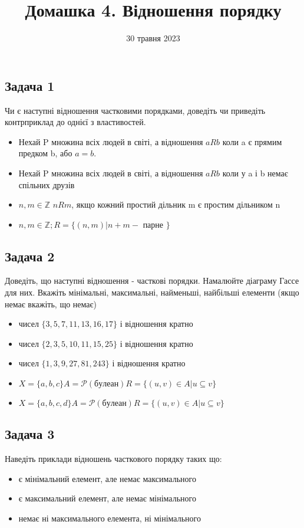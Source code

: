 \documentclass{article}
\begin{document}
\title{Домашка 4. Відношення порядку}
\date{30 травня 2023}

\maketitle

\subsection*{Задача 1}
Чи є наступні відношення частковими порядками, доведіть чи приведіть контрприклад до однієї з властивостей.
\begin{itemize}
    \item Нехай P множина всіх людей в світі, а відношення $aRb$ коли a є прямим предком b, або $a=b$.
    \item Нехай P множина всіх людей в світі, а відношення $aRb$ коли у a і b немає спільних друзів
    \item $n,m \in \mathbb{Z}$ $nRm$, якщо кожний простий дільник m є простим дільником n
    \item $n,m \in \mathbb{Z}; R = \{(n,m)|n+m -$ парне $\}$
\end{itemize}

\subsection*{Задача 2}
Доведіть, що наступні відношення - часткові порядки. Намалюйте діаграму Гассе для них. Вкажіть мінімальні, максимальні, найменьші, найбільші елементи (якщо немає вкажіть, що немає)
\begin{itemize}
    \item чисел $\{3, 5, 7, 11, 13, 16, 17\}$ і відношення кратно
    \item чисел $\{2, 3, 5, 10, 11, 15, 25\}$ і відношення кратно
    \item чисел $\{1, 3, 9, 27, 81, 243\}$ і відношення кратно
    \item $X=\{a,b,c\} A=\mathcal{P} (булеан)  R = \{(u,v) \in A| u \subseteq v\}$
    \item $X=\{a,b,c,d\} A=\mathcal{P} (булеан)  R = \{(u,v) \in A| u \subseteq v\}$
\end{itemize}

\subsection*{Задача 3}
Наведіть приклади відношень часткового порядку таких що:
\begin{itemize}
    \item є мінімальний елемент, але немає максимального
    \item є максимальний елемент, але немає мінімального
    \item немає ні максимального елемента, ні мінімального
\end{itemize}
\end{document}
